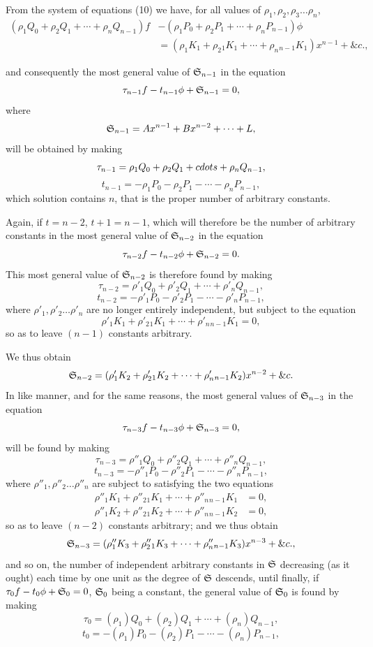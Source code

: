 \documentclass[11pt]{article}
\newcommand{\sourcepage}[1]{\marginpar{\scriptsize p.~#1}}
\begin{document}
From the system of equations (10) we have, for all values of $\rho_1,\rho_2,\rho_3\ldots\rho_n$,
\[
\begin{aligned}
(\rho_1Q_0+\rho_2Q_1+\cdots+\rho_nQ_{n-1})f
&-(\rho_1P_0+\rho_2P_1+\cdots+\rho_nP_{n-1})\phi\\
&=(\rho_1K_1+\rho_2{}_1K_1+\cdots+\rho_n{}_{n-1}K_1)x^{n-1}+\&c.,
\end{aligned}
\]

\sourcepage{465}
and consequently the most general value of $\mathfrak{S}_{n-1}$ in the equation
\[
\tau_{n-1}f-t_{n-1}\phi+\mathfrak{S}_{n-1}=0,
\]
where
\[
\mathfrak{S}_{n-1}=Ax^{n-1}+Bx^{n-2}+\cdots+L,
\]
will be obtained by making
\[
\tau_{n-1}=\rho_1Q_0+\rho_2Q_1+\\cdots+\rho_nQ_{n-1},
\]
\[
t_{n-1}=-\rho_1P_0-\rho_2P_1-\cdots-\rho_nP_{n-1},
\]
which solution contains $n$, that is the proper number of arbitrary constants.

Again, if $t=n-2$, $t+1=n-1$, which will therefore be the number of arbitrary constants in the most general value of $\mathfrak{S}_{n-2}$ in the equation
\[
\tau_{n-2}f-t_{n-2}\phi+\mathfrak{S}_{n-2}=0.
\]
This most general value of $\mathfrak{S}_{n-2}$ is therefore found by making
\[
\tau_{n-2}=\rho'_1Q_0+\rho'_2Q_1+\cdots+\rho'_nQ_{n-1},
\]
\[
t_{n-2}=-\rho'_1P_0-\rho'_2P_1-\cdots-\rho'_nP_{n-1},
\]
where $\rho'_1,\rho'_2\ldots\rho'_n$ are no longer entirely independent, but subject to the equation
\[
\rho'_1K_1+\rho'_2{}_1K_1+\cdots+\rho'_n{}_{n-1}K_1=0,
\]
so as to leave $(n-1)$ constants arbitrary.

We thus obtain
\[
\mathfrak{S}_{n-2}=(\rho'_1K_2+\rho'_2{}_1K_2+\cdots+\rho'_n{}_{n-1}K_2)x^{n-2}+\&c.
\]
In like manner, and for the same reasons, the most general values of $\mathfrak{S}_{n-3}$ in the equation
\[
\tau_{n-3}f-t_{n-3}\phi+\mathfrak{S}_{n-3}=0,
\]
will be found by making
\[
\tau_{n-3}=\rho''_1Q_0+\rho''_2Q_1+\cdots+\rho''_nQ_{n-1},
\]
\[
t_{n-3}=-\rho''_1P_0-\rho''_2P_1-\cdots-\rho''_nP_{n-1},
\]
where $\rho''_1,\rho''_2\ldots\rho''_n$ are subject to satisfying the two equations
\[
\begin{aligned}
\rho''_1K_1+\rho''_2{}_1K_1+\cdots+\rho''_n{}_{n-1}K_1&=0,\\
\rho''_1K_2+\rho''_2{}_1K_2+\cdots+\rho''_n{}_{n-1}K_2&=0,
\end{aligned}
\]
so as to leave $(n-2)$ constants arbitrary; and we thus obtain
\[
\mathfrak{S}_{n-3}=(\rho''_1K_3+\rho''_2{}_1K_3+\cdots+\rho''_n{}_{n-1}K_3)x^{n-3}+\&c.,
\]
and so on, the number of independent arbitrary constants in $\mathfrak{S}$ decreasing (as it ought) each time by one unit as the degree of $\mathfrak{S}$ descends, until finally, if $\tau_0f-t_0\phi+\mathfrak{S}_0=0$, $\mathfrak{S}_0$ being a constant, the general value of $\mathfrak{S}_0$ is found by making
\[
\tau_0=(\rho_1)Q_0+(\rho_2)Q_1+\cdots+(\rho_n)Q_{n-1},
\]
\[
t_0=-(\rho_1)P_0-(\rho_2)P_1-\cdots-(\rho_n)P_{n-1},
\]
\end{document}
